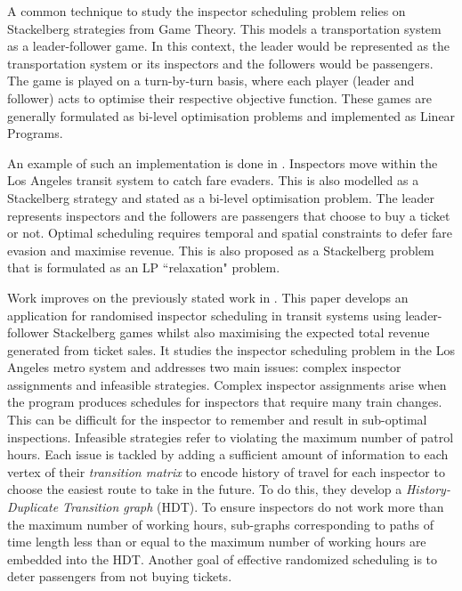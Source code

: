 \documentclass[11pt]{article}
\begin{document}
\par A common technique to study the inspector scheduling problem relies on Stackelberg strategies from Game Theory. This models a transportation system as a leader-follower game. In this context, the leader would be represented as the transportation system or its inspectors and the followers would be passengers. The game is played on a turn-by-turn basis, where each player (leader and follower) acts to optimise their respective objective function. These games are generally formulated as bi-level optimisation problems and implemented as Linear Programs.
\par An example of such an implementation is done in \cite{jiang_sandholm_2012}. Inspectors move within the Los Angeles transit system to catch fare evaders. This is also modelled as a Stackelberg strategy and stated as a bi-level optimisation problem. The leader represents inspectors and the followers are passengers that choose to buy a ticket or not. Optimal scheduling requires temporal and spatial constraints to defer fare evasion and maximise revenue. This is also proposed as a Stackelberg problem that is formulated as an LP ``relaxation" problem.
\par Work \cite{yin_sullivan_2012} improves on the previously stated work in \cite{jiang_sandholm_2012}. This paper develops an application for randomised inspector scheduling in transit systems using leader-follower Stackelberg games whilst also maximising the expected total revenue generated from ticket sales. It studies the inspector scheduling problem in the Los Angeles metro system and addresses two main issues: complex inspector assignments and infeasible strategies. Complex inspector assignments arise when the program produces schedules for inspectors that require many train changes. This can be difficult for the inspector to remember and result in sub-optimal inspections. Infeasible strategies refer to violating the maximum number of patrol hours. Each issue is tackled by adding a sufficient amount of information to each vertex of their \textit{transition matrix} to encode history of travel for each inspector to choose the easiest route to take in the future. To do this, they develop a \textit{History-Duplicate Transition graph} (HDT). To ensure inspectors do not work more than the maximum number of working hours, sub-graphs corresponding to paths of time length less than or equal to the maximum number of working hours are embedded into the HDT. Another goal of effective randomized scheduling is to deter passengers from not buying tickets.
\end{document}
